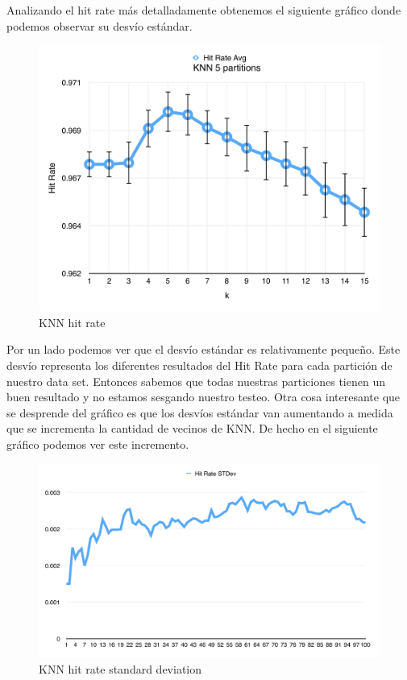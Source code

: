 Analizando el hit rate más detalladamente obtenemos el siguiente gráfico donde podemos observar su desvío estándar.

\begin{figure}[h!]
  \begin{center}
	\includegraphics[scale=0.7]{exp1/KNN-5p-Hit-Rate.png}
	\caption{KNN hit rate}
  \end{center}
\end{figure}

Por un lado podemos ver que el desvío estándar es relativamente pequeño. Este desvío representa los diferentes resultados del Hit Rate para cada partición de nuestro data set. Entonces sabemos que todas nuestras particiones tienen un buen resultado y no estamos sesgando nuestro testeo.
Otra cosa interesante que se desprende del gráfico es que los desvíos estándar van aumentando a medida que se incrementa la cantidad de vecinos de KNN. De hecho en el siguiente gráfico podemos ver este incremento.

\begin{figure}[h!]
  \begin{center}
	\includegraphics[scale=0.5]{exp1/KNN-5p-Hit-Rate-stdev.png}
	\caption{KNN hit rate standard deviation}
  \end{center}
\end{figure}

